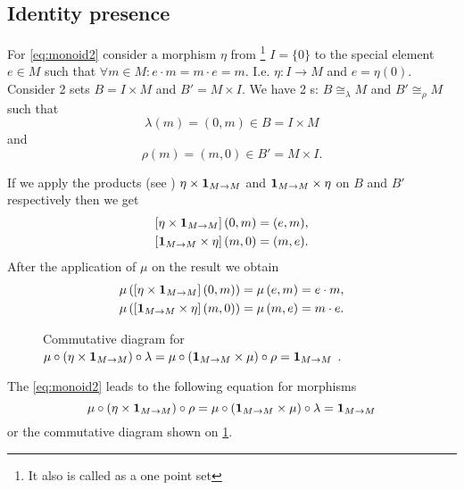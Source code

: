 \subsection{Identity presence}
For \eqref{eq:monoid2} consider a morphism $\eta$ from
\footnote{
 It also is called \cite[p.~2]{bib:maclane98} as a one point set
}
$I = \{0\}$ to the special element $e \in M$ such that
$\forall m \in M: e \cdot m = m \cdot e = m$. I.e. $\eta: I \to M$ and
$e = \eta(0)$. Consider 2 sets $B = I \times M$ and $B' = M \times I$. 
We have 2 s: $B \cong_\lambda M$ and $B'
\cong_\rho M$ such that
\[
\lambda(m) = (0, m) \in B = I \times M
\] 
and
\[
\rho(m) = (m, 0) \in B' = M \times I.
\] 

If we apply the products (see ) $\eta \times \mathbf{1}_{ M \to M }$ and
$\mathbf{1}_{ M \to M } \times \eta$ on $B$ and $B'$ respectively then we get
\begin{eqnarray}
\left[\eta \times \mathbf{1}_{ M \to M } \right]\left(0, m\right) = (e, m),
\nonumber \\
\left[\mathbf{1}_{ M \to M } \times \eta \right]\left(m, 0\right) = (m, e).
\nonumber
\end{eqnarray}
After the application of $\mu$ on the result we obtain
\begin{eqnarray}
\mu \left(\left[\eta \times \mathbf{1}_{ M \to M }\right] \left(0, m\right) \right) 
= \mu \left( e, m \right) = e \cdot m,
\nonumber \\
\mu \left(\left[ \mathbf{1}_{ M \to M } \times \eta \right]\left(m, 0\right) \right) = 
\mu \left(m, e \right) = m \cdot e.
\nonumber
\end{eqnarray}
\begin{figure}
  \centering
  \caption{Commutative diagram for $\mu \circ (\eta \times \mathbf{1}_{ M \to M })
    \circ \lambda = \mu \circ (\mathbf{1}_{ M \to M } \times \mu) \circ \rho =
    \mathbf{1}_{ M \to M }$ .} 
  \label{fig:monoid_eta_lambda_rho}
\end{figure}
The \eqref{eq:monoid2} leads to the following equation for morphisms
\[
\mu \circ (\eta \times \mathbf{1}_{ M \to M }) \circ \rho = 
\mu \circ (\mathbf{1}_{ M \to M } \times \mu) \circ \lambda = 
\mathbf{1}_{ M \to M }
\]
or the commutative diagram shown on \cref{fig:monoid_eta_lambda_rho}.

